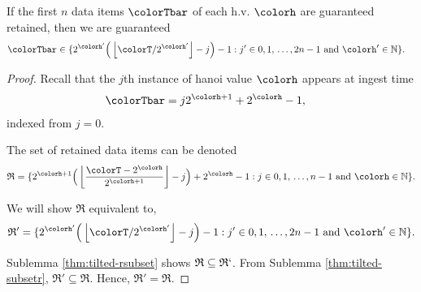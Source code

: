 \begin{lemma}
\label{thm:retained-equivalence-tilted}
If the first $n$ data items $\colorTbar$ of each h.v. $\colorh$ are guaranteed retained, then we are guaranteed
\begin{align*}
\colorTbar
&\in
\{
  2^{\colorh'}\Big(\left\lfloor \colorT / 2^{\colorh'} \right\rfloor - j\Big) - 1
  :
  j' \in 0,1,\,\ldots,2n-1
  \text{ and }
  \colorh' \in \mathbb{N}
\}.
\end{align*}
\end{lemma}
\begin{proof}

Recall that the $j$th instance of hanoi value $\colorh$ appears at ingest time
\begin{align*}
\colorTbar
&= j2^{\colorh + 1} + 2^{\colorh} - 1,
\end{align*}
indexed from $j=0$.

The set of retained data items can be denoted
\begin{align*}
\mathfrak{R} =
\{
  2^{\colorh + 1}\Big( \left\lfloor\frac{\colorT - 2^{\colorh}}{2^{\colorh + 1}} \right\rfloor - j\Big) + 2^{\colorh} - 1
  :
  j \in 0,1,\,\ldots,n-1
  \text{ and }
  \colorh \in \mathbb{N}
\}.
\end{align*}

We will show $\mathfrak{R}$ equivalent to,
\begin{align*}
\mathfrak{R}' =
\{
  2^{\colorh'}\Big(\left\lfloor \colorT / 2^{\colorh'} \right\rfloor - j\Big) - 1
  :
  j' \in 0,1,\,\ldots,2n-1
  \text{ and }
  \colorh' \in \mathbb{N}
\}.
\end{align*}

Sublemma \ref{thm:tilted-rsubset} shows $\mathfrak{R} \subseteq \mathfrak{R}`$.
From Sublemma \ref{thm:tilted-subsetr}, $\mathfrak{R}' \subseteq \mathfrak{R}$.
Hence, $\mathfrak{R}' = \mathfrak{R}$.

\end{proof}

